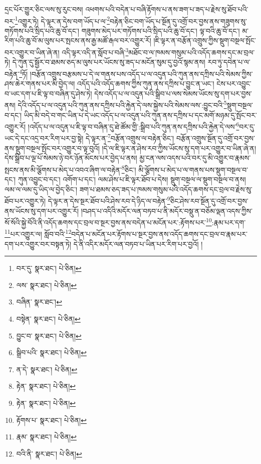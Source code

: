 དྲང་པོར་གྱུར་ཅིང་ལས་སུ་རུང་བས། འཕགས་པའི་བདེན་པ་བཞི་རྟོགས་པ་ནས་ཟག་པ་ཟད་པ་རྗེས་སུ་ཐོབ་པའི་བར་\footnote{བར་དུ་  སྣར་ཐང་།  པེ་ཅིན། }འགྱུར་ཏེ། དེ་ལྟར་ན་དེས་བག་ཡོད་པ་ལ་\footnote{ལས་  སྣར་ཐང་།  པེ་ཅིན། }བརྟེན་ཅིང་བག་ཡོད་པ་སྔོན་དུ་འགྲོ་བར་བྱས་ནས་གཟུགས་སུ་གཏོགས་པའི་སྲིད་པའི་ཆུ་བོ་དང་། གཟུགས་མེད་པར་གཏོགས་པའི་སྲིད་པའི་ཆུ་བོ་དང་། ལྟ་བའི་ཆུ་བོ་དང་། མ་རིག་པའི་ཆུ་བོ་མ་ལུས་པར་སྤངས་ནས་རྒྱ་མཚོ་རྒལ་བར་འགྱུར་རོ། །ཇི་ལྟར་ན་བརྩོན་འགྲུས་ཀྱིས་སྡུག་བསྔལ་སྤོང་བར་འགྱུར་བ་ཡིན་ཞེ་ན། འདི་ལྟར་འདི་ན་སློབ་པ་བཞི་\footnote{བཞིན་  སྣར་ཐང་། }མཐོང་བ་ལ་ཁམས་གསུམ་པའི་འདོད་ཆགས་དང་མ་བྲལ་ཏེ། དེ་ཀུན་དུ་སྦྱོར་བ་ཐམས་ཅད་མ་ལུས་པར་ཡོངས་སུ་ཟད་པ་མངོན་སུམ་དུ་བྱའོ་སྙམ་ནས། རབ་ཏུ་དབེན་པ་ལ་བརྟེན་\footnote{བསྟེན་  སྣར་ཐང་།  པེ་ཅིན། }ཏོ། །བརྩོན་འགྲུས་བརྩམས་པ་དེ་ལ་གནས་པས་འདོད་པ་ལ་འདུན་པའི་ཀུན་ནས་དཀྲིས་པའི་སེམས་ཀྱིས་ཤས་ཆེར་གནས་པར་མི་བྱེད་ལ། འདོད་པའི་འདོད་ཆགས་ཀྱིས་ཀུན་ནས་དཀྲིས་པ་བྱུང་ན་ཡང་། ངེས་པར་འབྱུང་བ་ཡང་དག་པ་ཇི་ལྟ་བ་བཞིན་དུ་ཤེས་ཏེ། དེས་འདོད་པ་ལ་འདུན་པའི་སྒྲིབ་པ་ལས་སེམས་ཡོངས་སུ་དག་པར་བྱས་ནས། དེའི་འདོད་པ་ལ་འདུན་པའི་ཀུན་ནས་དཀྲིས་པའི་རྐྱེན་དེ་ལས་སྐྱེས་པའི་སེམས་ལས་:བྱུང་བའི་\footnote{བྱུང་བ་  སྣར་ཐང་།  པེ་ཅིན། }སྡུག་བསྔལ་བ་དང་། ཡིད་མི་བདེ་བ་གང་ཡིན་པ་དེ་ཡང་འདོད་པ་ལ་འདུན་པའི་ཀུན་ནས་དཀྲིས་པ་དང་མགོ་མཉམ་དུ་སྤོང་བར་འགྱུར་རོ། །འདོད་པ་ལ་འདུན་པ་ཇི་ལྟ་བ་བཞིན་དུ་ཐེ་ཚོམ་གྱི་:སྒྲིབ་པའི་ཀུན་ནས་དཀྲིས་པའི་རྐྱེན་དེ་ལས་\footnote{སྒྲིབ་པའི་  སྣར་ཐང་།  པེ་ཅིན། }བར་དུ་ཡང་དེ་དང་འདྲ་བར་རིག་པར་བྱ་སྟེ། དེ་ལྟར་ན་\footnote{ན་དེ་  སྣར་ཐང་།  པེ་ཅིན། }བརྩོན་འགྲུས་ལ་བརྟེན་ཅིང་། བརྩོན་འགྲུས་སྔོན་དུ་འགྲོ་བར་བྱས་ནས་སྡུག་བསྔལ་སྤོང་བར་འགྱུར་བ་ལྟ་བུའོ། །དེ་ལ་ཇི་ལྟར་ན་ཤེས་རབ་ཀྱིས་ཡོངས་སུ་དག་པར་འགྱུར་བ་ཡིན་ཞེ་ན། དེས་སྒྲིབ་པ་ལྔ་པོ་སེམས་ཉེ་བར་ཉོན་མོངས་པར་བྱེད་པ་ནས། མྱ་ངན་ལས་འདས་པའི་བར་དུ་མི་འགྱུར་བ་རྣམས་སྤངས་ནས་མི་ལྕོགས་པ་མེད་པ་འབའ་ཞིག་ལ་བརྟེན་\footnote{རྟེན་  སྣར་ཐང་།  པེ་ཅིན། }ཅིང་། མི་ལྕོགས་པ་མེད་པ་ལ་གནས་པས་སྡུག་བསྔལ་བ་དང་། ཀུན་འབྱུང་བ་དང་། འགོག་པ་དང་། ལམ་ཤེས་པ་ཇི་ལྟར་ཐོབ་པ་དེས། སྡུག་བསྔལ་ལ་སྡུག་བསྔལ་བ་ནས། ལམ་ལ་ལམ་དུ་ཡིད་ལ་བྱེད་ཅིང་། ཟག་པ་ཐམས་ཅད་ཟད་པ་ཁམས་གསུམ་པའི་འདོད་ཆགས་དང་བྲལ་བ་རྗེས་སུ་ཐོབ་པར་འགྱུར་ཏེ། དེ་ལྟར་ན་དེས་སྔར་ཐོབ་པའི་ཤེས་རབ་དེ་ཉིད་ལ་བརྟེན་\footnote{རྟེན་  སྣར་ཐང་།  པེ་ཅིན། }ཅིང་ཤེས་རབ་སྔོན་དུ་འགྲོ་བར་བྱས་ནས་ཡོངས་སུ་དག་པར་འགྱུར་རོ། །བཤད་པ་འདིའི་མདོར་ལན་བཏབ་པ་ནི་མདོར་བསྡུ་ན་བཅོམ་ལྡན་འདས་ཀྱིས་སོ་སོའི་སྐྱེ་བོའི་ནི་འདོད་ཆགས་དང་བྲལ་བ་སྔར་བྱས་ནས་བདེན་པ་མངོན་པར་:རྟོགས་པར་\footnote{རྟོགས་པ་  སྣར་ཐང་།  པེ་ཅིན། }:རྣམ་པར་དག་\footnote{རྣམ་  སྣར་ཐང་།  པེ་ཅིན། }པར་འགྱུར་ལ། སློབ་བའི་\footnote{བའི་ནི་  སྣར་ཐང་།  པེ་ཅིན། }བདེན་པ་མངོན་པར་རྟོགས་པ་སྔར་བྱས་ནས་འདོད་ཆགས་དང་བྲལ་བ་རྣམ་པར་དག་པར་འགྱུར་བར་བསྟན་ཏེ། དེ་ནི་འདིར་མདོར་ལན་བཏབ་པ་ཡིན་པར་རིག་པར་བྱའོ། །
